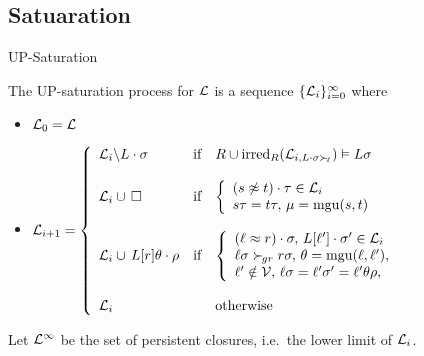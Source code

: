 \documentclass[%
handout,
]{beamer}
\begin{document}
\subsection{Satuaration}
\begin{frame}{UP-Saturation}

        The UP-{saturation process} for $\mathcal{L}$ is a sequence \( \{ \mathcal{L}_i \}_{i=0}^\infty \) where

        \begin{itemize}
            \item $\mathcal{L}_0 = \mathcal{L}$


        \item
        $\mathcal{L}_{i+1} = \left\{
                \begin{array}{lclc}
                    \mathcal{L}_i \backslash L\cdot\sigma
                    &\text{if}
                    &R \cup \operatorname{irred}_R(\mathcal{L}_{i,L\cdot\sigma\mathrel\succ_{\!\ell}}) \vDash L\sigma
                    \\
                    \\
                    \mathcal{L}_i \cup\,\square
                    &\text{if}
                    &\left\{\begin{array}{l}
                        (s\not\approx t)\cdot\tau\in\mathcal{L}_i
                        \\
                        s\tau = t\tau,\,
                        \mu=\operatorname{mgu}(s,t)
                    \end{array}\right.
                    \\
                    \\
                    \mathcal{L}_i \cup\, L[r]\theta\cdot\rho
                    &\text{if}
                    &\left\{\begin{array}{l}
                        (\ell\approx r)\cdot\sigma,\,
                        L[\ell']\cdot\sigma'\in\mathcal{L}_i
                        \\
                        \ell\sigma\mathrel\succ_{\!gr} r\sigma,\,
                        \theta=\operatorname{mgu}(\ell,\ell'),
                        \\
                        \ell'\notin\mathcal{V},\,
                        \ell\sigma = \ell'\sigma' = \ell'\theta\rho,
                    \end{array}\right.
                    \\
                    \\
                    \mathcal{L}_i
                    &&\text{otherwise}
                \end{array}
            \right.$
    \end{itemize}

\vspace{0.7em}

        Let \( \mathcal{L}^\infty \) be the set of persistent closures, i.e.~the lower limit of $\mathcal{L}_i$.


\end{frame}
\end{document}
